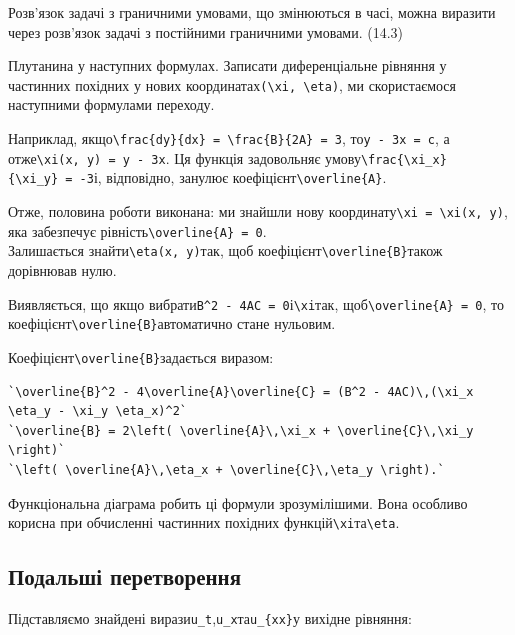 \documentclass[
  ukrainian,
]{article}
\begin{document}
Розв'язок задачі з граничними умовами, що змінюються в часі, можна
виразити через розв'язок задачі з постійними граничними умовами. (14.3)

Плутанина у наступних формулах. Записати диференціальне рівняння у
частинних похідних у нових
координатах\texttt{(\textbackslash{}xi,\ \textbackslash{}eta)}, ми
скористаємося наступними формулами переходу.

Наприклад,
якщо\texttt{\textbackslash{}frac\{dy\}\{dx\}\ =\ \textbackslash{}frac\{B\}\{2A\}\ =\ 3},
то\texttt{y\ -\ 3x\ =\ c}, а
отже\texttt{\textbackslash{}xi(x,\ y)\ =\ y\ -\ 3x}. Ця функція
задовольняє
умову\texttt{\textbackslash{}frac\{\textbackslash{}xi\_x\}\{\textbackslash{}xi\_y\}\ =\ -3}і,
відповідно, занулює коефіцієнт\texttt{\textbackslash{}overline\{A\}}.

Отже, половина роботи виконана: ми знайшли нову
координату\texttt{\textbackslash{}xi\ =\ \textbackslash{}xi(x,\ y)}, яка
забезпечує рівність\texttt{\textbackslash{}overline\{A\}\ =\ 0}.\\
Залишається знайти\texttt{\textbackslash{}eta(x,\ y)}так, щоб
коефіцієнт\texttt{\textbackslash{}overline\{B\}}також дорівнював нулю.

Виявляється, що якщо
вибрати\texttt{B\^{}2\ -\ 4AC\ =\ 0}і\texttt{\textbackslash{}xi}так,
щоб\texttt{\textbackslash{}overline\{A\}\ =\ 0}, то
коефіцієнт\texttt{\textbackslash{}overline\{B\}}автоматично стане
нульовим.

Коефіцієнт\texttt{\textbackslash{}overline\{B\}}задається виразом:

\begin{verbatim}
`\overline{B}^2 - 4\overline{A}\overline{C} = (B^2 - 4AC)\,(\xi_x \eta_y - \xi_y \eta_x)^2`
`\overline{B} = 2\left( \overline{A}\,\xi_x + \overline{C}\,\xi_y \right)`
`\left( \overline{A}\,\eta_x + \overline{C}\,\eta_y \right).`
\end{verbatim}

Функціональна діаграма робить ці формули зрозумілішими. Вона особливо
корисна при обчисленні частинних похідних
функцій\texttt{\textbackslash{}xi}та\texttt{\textbackslash{}eta}.

\subsection{Подальші
перетворення}\label{ux43fux43eux434ux430ux43bux44cux448ux456-ux43fux435ux440ux435ux442ux432ux43eux440ux435ux43dux43dux44f}

Підставляємо знайдені
вирази\texttt{u\_t},\texttt{u\_x}та\texttt{u\_\{xx\}}у вихідне рівняння:
\end{document}
